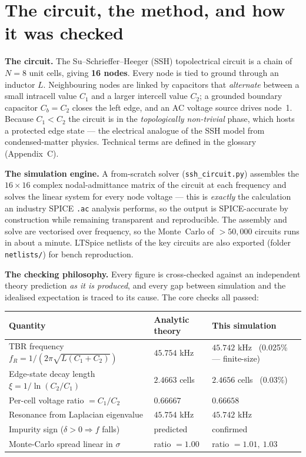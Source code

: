 \documentclass[11pt]{article}
\begin{document}
\section*{The circuit, the method, and how it was checked}

\textbf{The circuit.}
The Su--Schrieffer--Heeger (SSH) topolectrical circuit is a chain of
$N=8$ unit cells, giving \textbf{16 nodes}. Every node is tied to ground
through an inductor $L$. Neighbouring nodes are linked by capacitors that
\emph{alternate} between a small intracell value $C_1$ and a larger
intercell value $C_2$; a grounded boundary capacitor $C_b=C_2$ closes the
left edge, and an AC voltage source drives node~1. Because $C_1<C_2$ the
circuit is in the \emph{topologically non-trivial} phase, which hosts a
protected edge state --- the electrical analogue of the SSH model from
condensed-matter physics. Technical terms are defined in the
glossary (Appendix~C).

\medskip
\textbf{The simulation engine.}
A from-scratch solver (\texttt{ssh\_circuit.py}) assembles the
$16\times16$ complex nodal-admittance matrix of the circuit at each
frequency and solves the linear system for every node voltage --- this is
\emph{exactly} the calculation an industry SPICE \texttt{.ac} analysis
performs, so the output is SPICE-accurate by construction while remaining
transparent and reproducible. The assembly and solve are vectorised over
frequency, so the Monte~Carlo of $>50{,}000$ circuits runs in about a
minute. LTSpice netlists of the key circuits are also exported (folder
\texttt{netlists/}) for bench reproduction.

\medskip
\textbf{The checking philosophy.}
Every figure is cross-checked against an independent theory prediction
\emph{as it is produced}, and every gap between simulation and the
idealised expectation is traced to its cause. The core checks all passed:

\begin{center}\small
\begin{tabular}{lll}
\toprule
\textbf{Quantity} & \textbf{Analytic theory} & \textbf{This simulation}\\
\midrule
TBR frequency $f_R=1/(2\pi\sqrt{L(C_1{+}C_2)})$ & $45.754$ kHz
   & $45.742$ kHz \ (0.025\% --- finite-size)\\
Edge-state decay length $\xi=1/\ln(C_2/C_1)$ & $2.4663$ cells
   & $2.4656$ cells \ (0.03\%)\\
Per-cell voltage ratio $=C_1/C_2$ & $0.66667$ & $0.66658$\\
Resonance from Laplacian eigenvalue & $45.754$ kHz & $45.742$ kHz\\
Impurity sign ($\delta>0 \Rightarrow f$ falls) & predicted & confirmed\\
Monte-Carlo spread linear in $\sigma$ & ratio $=1.00$
   & ratio $=1.01,\ 1.03$\\
\bottomrule
\end{tabular}
\end{center}
\end{document}
